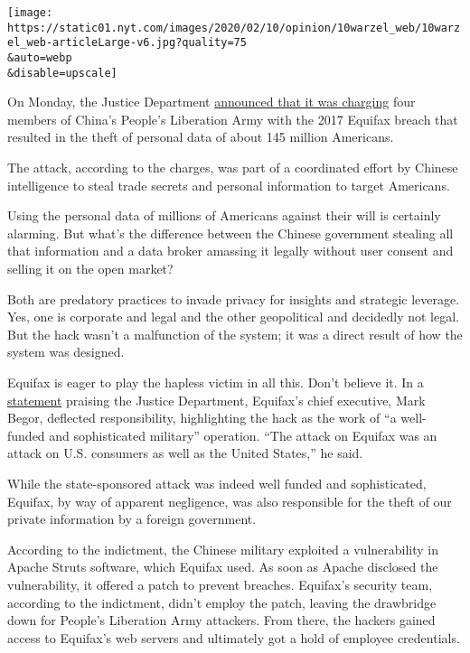 \texttt{[image: https://static01.nyt.com/images/2020/02/10/opinion/10warzel\_web/10warzel\_web-articleLarge-v6.jpg?quality=75\\\&auto=webp\\\&disable=upscale]}

On Monday, the Justice Department
\href{https://www.nytimes.com/2020/02/10/us/politics/equifax-hack-china.html}{announced
that it was charging} four members of China's People's Liberation Army
with the 2017 Equifax breach that resulted in the theft of personal data
of about 145 million Americans.

The attack, according to the charges, was part of a coordinated effort
by Chinese intelligence to steal trade secrets and personal information
to target Americans.

Using the personal data of millions of Americans against their will is
certainly alarming. But what's the difference between the Chinese
government stealing all that information and a data broker amassing it
legally without user consent and selling it on the open market?

Both are predatory practices to invade privacy for insights and
strategic leverage. Yes, one is corporate and legal and the other
geopolitical and decidedly not legal. But the hack wasn't a malfunction
of the system; it was a direct result of how the system was designed.

Equifax is eager to play the hapless victim in all this. Don't believe
it. In a
\href{https://investor.equifax.com/news-and-events/news/2020/02-10-2020-160714269}{statement}
praising the Justice Department, Equifax's chief executive, Mark Begor,
deflected responsibility, highlighting the hack as the work of ``a
well-funded and sophisticated military'' operation. ``The attack on
Equifax was an attack on U.S. consumers as well as the United States,''
he said.

While the state-sponsored attack was indeed well funded and
sophisticated, Equifax, by way of apparent negligence, was also
responsible for the theft of our private information by a foreign
government.

According to the indictment, the Chinese military exploited a
vulnerability in Apache Struts software, which Equifax used. As soon as
Apache disclosed the vulnerability, it offered a patch to prevent
breaches. Equifax's security team, according to the indictment, didn't
employ the patch, leaving the drawbridge down for People's Liberation
Army attackers. From there, the hackers gained access to Equifax's web
servers and ultimately got a hold of employee credentials.

